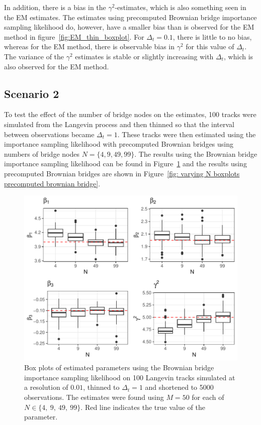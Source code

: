 In addition, there is a bias in the $\gamma^2$-estimates, which is also something seen in the EM estimates. The estimates using precomputed Brownian bridge importance sampling likelihood do, however, have a smaller bias than is observed for the EM method in figure~\ref{fig:EM_thin_boxplot}. For $\Delta_t=0.1$, there is little to no bias, whereas for the EM method, there is observable bias in $\gamma^2$ for this value of $\Delta_t$. The variance of the $\gamma^2$ estimates is stable or slightly increasing with $\Delta_t$, which is also observed for the EM method.


\subsection{Scenario 2}
To test the effect of the number of bridge nodes on the estimates, 100 tracks were simulated from the Langevin process and then thinned so that the interval between observations became $\Delta_t =1$. These tracks were then estimated using the importance sampling likelihood with precomputed Brownian bridges using numbers of bridge nodes $N =\{4,9,49,99\}$. The results using the Brownian bridge importance sampling likelihood can be found in Figure~\ref{fig: varying N boxplots brownian bridge} and the results using precomputed Brownian bridges are shown in Figure~\ref{fig: varying N boxplots precomputed brownian bridge}. 

\begin{figure}[H]
    \centering
    \includegraphics[width=\linewidth]{Images/Results/varying N estimates BB.pdf}
    \caption[Box plots of Parameter Estimates using Brownian bridge importance sampling using different number of bridge nodes]{Box plots of estimated parameters using the Brownian bridge importance sampling likelihood on 100 Langevin tracks simulated at a resolution of $0.01$, thinned to $\Delta_t = 1$ and shortened to 5000 observations. The estimates were found using $M=50$ for each of $N \in \{4 , \ 9, \ 49, \ 99\}$. Red line indicates the true value of the parameter.}
    \label{fig: varying N boxplots brownian bridge}
\end{figure}

